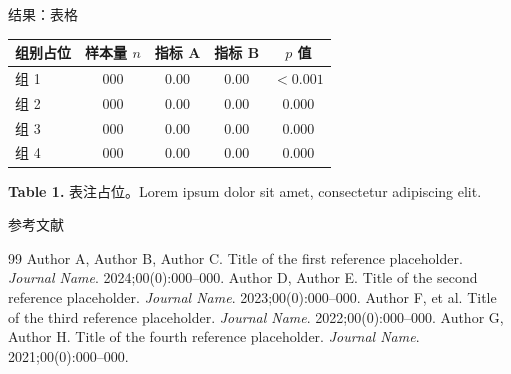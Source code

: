 \documentclass[aspectratio=169,11pt]{beamer}
\begin{document}
\begin{frame}{结果：表格}
  \begin{minipage}[t][.78\paperheight][t]{.92\paperwidth}
    \centering
    {\small
    \begin{tabular}{l c c c c}
      \toprule
      组别占位 & 样本量 $n$ & 指标 A & 指标 B & $p$ 值 \\
      \midrule
      组 1 & 000 & 0.00 & 0.00 & $<0.001$ \\
      组 2 & 000 & 0.00 & 0.00 & 0.000 \\
      组 3 & 000 & 0.00 & 0.00 & 0.000 \\
      组 4 & 000 & 0.00 & 0.00 & 0.000 \\
      \bottomrule
    \end{tabular}}\par\vspace{6pt}
    {\footnotesize \textbf{Table 1.} 表注占位。Lorem ipsum dolor sit amet, consectetur adipiscing elit.\par}
  \end{minipage}
\end{frame}

\begin{frame}{参考文献}
  \footnotesize\color{refc}
  \begin{thebibliography}{99}\setlength\itemsep{3pt}
     Author A, Author B, Author C. Title of the first reference placeholder. \textit{Journal Name}. 2024;00(0):000--000.
     Author D, Author E. Title of the second reference placeholder. \textit{Journal Name}. 2023;00(0):000--000.
     Author F, et al. Title of the third reference placeholder. \textit{Journal Name}. 2022;00(0):000--000.
     Author G, Author H. Title of the fourth reference placeholder. \textit{Journal Name}. 2021;00(0):000--000.
  \end{thebibliography}
\end{frame}
\end{document}
